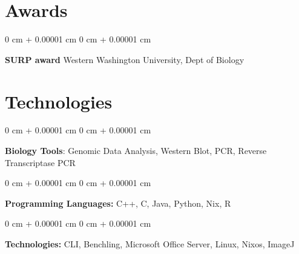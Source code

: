 \documentclass[10pt, letterpaper]{article}
\newenvironment{onecolentry}{
    \begin{adjustwidth}{
        0 cm + 0.00001 cm
    }{
        0 cm + 0.00001 cm
    }
}{
    \end{adjustwidth}
} %
\newenvironment{twocolentry}[2][]{
    \onecolentry
    \def\secondColumn{#2}
    \setcolumnwidth{\fill, 4.5 cm}
    \begin{paracol}{2}
}{
    \switchcolumn \raggedleft \secondColumn
    \end{paracol}
    \endonecolentry
} %
\begin{document}
    \section{Awards}
    \begin{twocolentry}
      {2025}
      \textbf{SURP award} \newline
      Western Washington University, Dept of Biology
    \end{twocolentry}


    \section{Technologies}



        \begin{onecolentry}
            {\textbf{Biology Tools}:} Genomic Data Analysis, Western Blot, PCR, Reverse Transcriptase PCR
        \end{onecolentry}
        \vspace{0.2 cm}
        \begin{onecolentry}
            \textbf{Programming Languages:} C++, C, Java, Python, Nix, R
        \end{onecolentry}

        \vspace{0.2 cm}

        \begin{onecolentry}
            \textbf{Technologies:} CLI, Benchling, Microsoft Office Server, Linux, Nixos, ImageJ
        \end{onecolentry}
\end{document}

